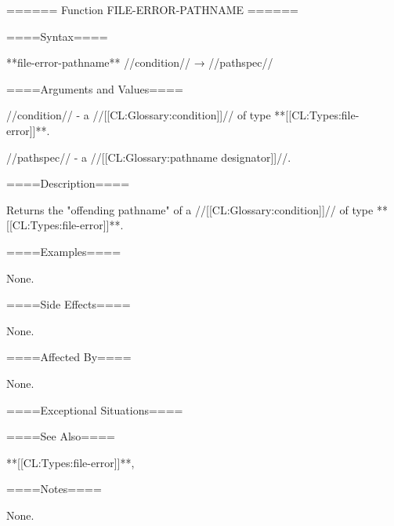 ====== Function FILE-ERROR-PATHNAME ======

====Syntax====

**file-error-pathname** //condition// → //pathspec//

====Arguments and Values====

//condition// - a //[[CL:Glossary:condition]]// of type **[[CL:Types:file-error]]**.

//pathspec// - a //[[CL:Glossary:pathname designator]]//.

====Description====

Returns the "offending pathname" of a //[[CL:Glossary:condition]]// of type **[[CL:Types:file-error]]**.

====Examples====

None.

====Side Effects====

None.

====Affected By====

None.

====Exceptional Situations====

====See Also====

**[[CL:Types:file-error]]**,{\secref\Conditions}

====Notes====

None.

